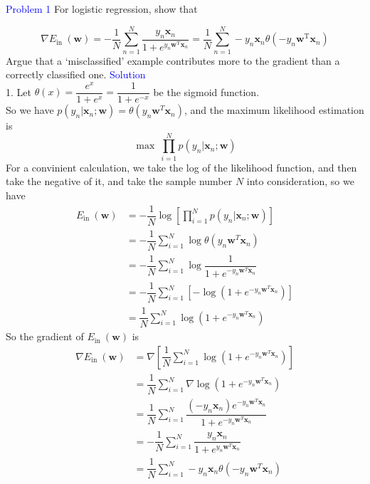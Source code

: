 \textcolor{blue}{Problem 1}
For logistic regression, show that

\begin{equation}
    \nabla E_{\text {in }}(\mathbf{w})  =-\frac{1}{N} \sum_{n=1}^{N} \frac{y_{n} \mathbf{x}_{n}}{1+e^{y_{n} \mathbf{w}^{\mathrm{T}} \mathbf{x}_{n}}}  
 =\frac{1}{N} \sum_{n=1}^{N}-y_{n} \mathbf{x}_{n} \theta\left(-y_{n} \mathbf{w}^{\mathrm{T}} \mathbf{x}_{n}\right)
\end{equation}
Argue that a `misclassified' example contributes more to the gradient than a correctly classified one.
\textcolor{blue}{Solution}\\
1. Let $\theta(x)=\dfrac{e^x}{1+e^x}=\dfrac{1}{1+e^{-x}}$ be the sigmoid function. \\
So we have $p(y_n|\mathbf{x}_n;\mathbf{w})=\theta(y_n\mathbf{w}^T\mathbf{x}_n)$, and the maximum likelihood estimation is
$$ \max\ \prod_{i=1}^{N}p(y_n|\mathbf{x}_n;\mathbf{w})$$
For a convinient calculation, we take the log of the likelihood function, and then take the negative of it, and take the sample number $N$ into consideration, so we have
\begin{align*}
    E_{\text {in }}(\mathbf{w}) &= -\dfrac{1}{N}\log[\prod_{i=1}^{N}p(y_n|\mathbf{x}_n;\mathbf{w})] \\
    &= -\dfrac{1}{N}\sum_{i=1}^{N}\log \theta(y_n\mathbf{w}^T\mathbf{x}_n)\\
    &= -\dfrac{1}{N}\sum_{i=1}^{N}\log \dfrac{1}{1+e^{-y_n\mathbf{w}^T\mathbf{x}_n}}\\
    &= -\dfrac{1}{N}\sum_{i=1}^{N} [- \log (1+e^{-y_n\mathbf{w}^T\mathbf{x}_n})]\\
    &= \dfrac{1}{N}\sum_{i=1}^{N}\log (1+e^{-y_n\mathbf{w}^T\mathbf{x}_n})
\end{align*}
So the gradient of $E_{\text {in }}(\mathbf{w})$ is
\begin{align*}
    \nabla E_{\text {in }}(\mathbf{w}) &= \nabla\left[\dfrac{1}{N}\sum_{i=1}^{N}\log (1+e^{-y_n\mathbf{w}^T\mathbf{x}_n}) \right] \\
    &= \dfrac{1}{N}\sum_{i=1}^{N}\nabla \log (1+e^{-y_n\mathbf{w}^T\mathbf{x}_n})\\
    &= \dfrac{1}{N}\sum_{i=1}^{N}\dfrac{(-y_n\mathbf{x}_n) e^{-y_n\mathbf{w}^T\mathbf{x}_n}}{1+e^{-y_n\mathbf{w}^T\mathbf{x}_n}}\\
    &= -\dfrac{1}{N}\sum_{i=1}^{N}\dfrac{y_n\mathbf{x}_n}{1+e^{y_n\mathbf{w}^T\mathbf{x}_n}}\\
    &= \dfrac{1}{N}\sum_{i=1}^{N}-y_n\mathbf{x}_n\theta(-y_n\mathbf{w}^T\mathbf{x}_n)
\end{align*}

